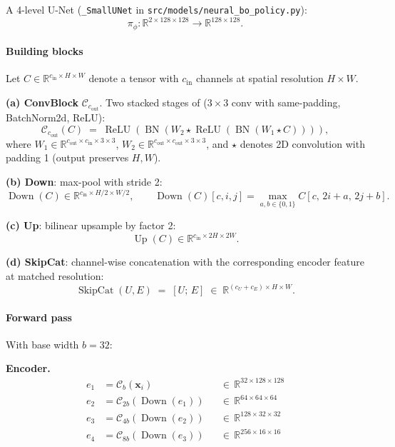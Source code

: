 \documentclass[11pt]{article}
\newcommand{\code}[1]{\texttt{#1}}
\begin{document}
A 4-level U-Net (\code{\_SmallUNet} in \code{src/models/neural\_bo\_policy.py}):
\[
  \pi_\phi : \mathbb{R}^{2\times128\times128} \to \mathbb{R}^{128\times128}.
\]

\paragraph{Building blocks}
Let $C \in \mathbb{R}^{c_{\text{in}} \times H \times W}$ denote a tensor with $c_{\text{in}}$ channels at spatial resolution $H \times W$.

\textbf{(a) ConvBlock} $\mathcal{C}_{c_{\text{out}}}$.  Two stacked stages of ($3{\times}3$ conv with same-padding, BatchNorm2d, ReLU):
\[
  \mathcal{C}_{c_{\text{out}}}(C) \;=\; \operatorname{ReLU}\!\left(\operatorname{BN}\!\left(W_2 \star \operatorname{ReLU}\!\left(\operatorname{BN}\!\left(W_1 \star C\right)\right)\right)\right),
\]
where $W_1 \in \mathbb{R}^{c_{\text{out}}\times c_{\text{in}}\times 3\times 3}$, $W_2 \in \mathbb{R}^{c_{\text{out}}\times c_{\text{out}}\times 3\times 3}$, and $\star$ denotes 2D convolution with padding 1 (output preserves $H, W$).

\textbf{(b) Down}: max-pool with stride 2:
\[
  \operatorname{Down}(C) \in \mathbb{R}^{c_{\text{in}}\times H/2 \times W/2}, \qquad
  \operatorname{Down}(C)[c, i, j] = \max_{a,b\in\{0,1\}} C[c,\, 2i+a,\, 2j+b].
\]

\textbf{(c) Up}: bilinear upsample by factor 2:
\[
  \operatorname{Up}(C) \in \mathbb{R}^{c_{\text{in}}\times 2H \times 2W}.
\]

\textbf{(d) SkipCat}: channel-wise concatenation with the corresponding encoder feature at matched resolution:
\[
  \operatorname{SkipCat}(U, E) \;=\; [U;\,E] \;\in\; \mathbb{R}^{(c_U+c_E)\times H \times W}.
\]

\paragraph{Forward pass}
With base width $b = 32$:

\textbf{Encoder.}
\[
\begin{aligned}
e_1 &= \mathcal{C}_{b}(\mathbf{x}_i)            && \in\,\mathbb{R}^{32\times128\times128}\\
e_2 &= \mathcal{C}_{2b}(\operatorname{Down}(e_1))     && \in\,\mathbb{R}^{64\times64\times64}\\
e_3 &= \mathcal{C}_{4b}(\operatorname{Down}(e_2))     && \in\,\mathbb{R}^{128\times32\times32}\\
e_4 &= \mathcal{C}_{8b}(\operatorname{Down}(e_3))     && \in\,\mathbb{R}^{256\times16\times16}
\end{aligned}
\]
\end{document}
